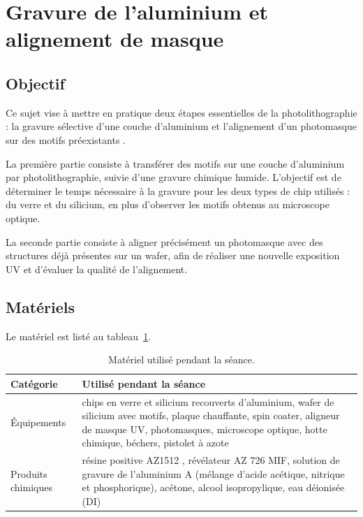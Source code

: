 \section{Gravure de l'aluminium et alignement de masque}

\subsection{Objectif}

\noindent Ce sujet vise à mettre en pratique deux étapes essentielles de la photolithographie : la gravure sélective d’une couche d’aluminium et l’alignement d’un photomasque sur des motifs préexistants \cite{intro,prot4}.

\noindent La première partie consiste à transférer des motifs sur une couche d’aluminium par photolithographie, suivie d’une gravure chimique humide. L’objectif est de déterminer le temps nécessaire à la gravure pour les deux types de chip utilisés : du verre et du silicium, en plus d’observer les motifs obtenus au microscope optique.

\noindent La seconde partie consiste à aligner précisément un photomasque avec des structures déjà présentes sur un wafer, afin de réaliser une nouvelle exposition UV et d'évaluer la qualité de l'alignement.

\subsection{Matériels}
Le matériel est listé au tableau~\ref{tab:s4-materiel}.

\begin{table}[htbp]
  \centering\small
  \caption{Matériel utilisé pendant la séance.}
  \label{tab:s4-materiel}
  \begin{tabularx}{\linewidth}{@{}lX@{}}
    \toprule
    \textbf{Catégorie} & \textbf{Utilisé pendant la séance} \\
    \midrule
    Équipements & chips en verre et silicium recouverts d'aluminium, wafer de silicium avec motifs, plaque chauffante, spin coater, aligneur de masque UV, photomasques, microscope optique, hotte chimique, béchers, pistolet à azote \\
    Produits chimiques & résine positive AZ1512 \cite{tdsaz1500}, révélateur AZ 726 MIF, solution de gravure de l'aluminium A (mélange d'acide acétique, nitrique et phosphorique), acétone, alcool isopropylique, eau déionisée (DI) \\
    \bottomrule
  \end{tabularx}
\end{table}


